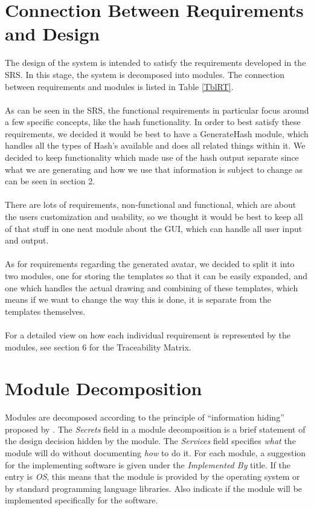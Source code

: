 \documentclass[12pt, titlepage]{article}
\begin{document}
\section{Connection Between Requirements and Design} \label{SecConnection}

The design of the system is intended to satisfy the requirements developed in
the SRS. In this stage, the system is decomposed into modules. The connection
between requirements and modules is listed in Table \ref{TblRT}.
\\\\
As can be seen in the SRS, the functional requirements in particular focus around a few specific concepts, like the hash functionality. In order to best satisfy these requirements, we decided it would be best to have a GenerateHash module, which handles all the types of Hash's available and does all related things within it. We decided to keep functionality which made use of the hash output separate since what we are generating and how we use that information is subject to change as can be seen in section 2.
\\\\
There are lots of requirements, non-functional and functional, which are about the users customization and usability, so we thought it would be best to keep all of that stuff in one neat module about the GUI, which can handle all user input and output.
\\\\
As for requirements regarding the generated avatar, we decided to split it into two modules, one for storing the templates so that it can be easily expanded, and one which handles the actual drawing and combining of these templates, which means if we want to change the way this is done, it is separate from the templates themselves.
\\\\
For a detailed view on how each individual requirement is represented by the modules, see section 6 for the Traceability Matrix.

\section{Module Decomposition} \label{SecMD}

Modules are decomposed according to the principle of ``information hiding''
proposed by \citet{ParnasEtAl1984}. The \emph{Secrets} field in a module
decomposition is a brief statement of the design decision hidden by the
module. The \emph{Services} field specifies \emph{what} the module will do
without documenting \emph{how} to do it. For each module, a suggestion for the
implementing software is given under the \emph{Implemented By} title. If the
entry is \emph{OS}, this means that the module is provided by the operating
system or by standard programming language libraries.  Also indicate if the
module will be implemented specifically for the software.
\end{document}
